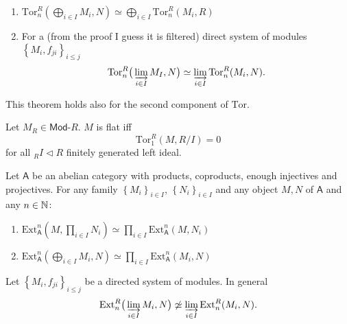 \begin{prop}\leavevmode\vspace{-.2\baselineskip}
	\begin{enumerate}
		\item $\mathrm{Tor}^R_n \left( \bigoplus_{i \in I} M_i, N \right) \simeq
			\bigoplus_{i \in I} \mathrm{Tor}^R_n(M_i,R)$

		\item For a (from the proof I guess it is filtered)
			direct system of modules $\left\{ M_i, f_{ji} \right\}_{i \leq j}$
			\begin{equation}
				\mathrm{Tor}^R_n \big( \varinjlim_{i \in I} M_I, N \big) \simeq
				\varinjlim_{i \in I} \mathrm{Tor}^R_n(M_i, N)
			.\end{equation} 
	\end{enumerate}
	This theorem holds also for the second component of $\mathrm{Tor}$.
\end{prop}

\begin{lem}
	Let $M_R \in \mathsf{Mod}\text{-}R$.
	$M$ is flat iff 
	\begin{equation}
		\mathrm{Tor}^R_1 (M, R/I) = 0
	\end{equation} 
	for all ${}_RI \triangleleft R$ finitely generated left ideal.
\end{lem} 

\begin{prop}
	Let $\mathsf{A}$ be an abelian category with products, coproducts,
	enough injectives and projectives.
	For any family $\left\{ M_i \right\}_{i \in I}$, $\left\{ N_i \right\}_{i \in I}$ and
	any object $M,N$ of $\mathsf{A}$ and any $n \in \mathbb{N}$:
	\begin{enumerate}
		\item $\mathrm{Ext}^n_{\mathsf{A}} \left( M, \prod_{i \in I} N_i\right) \simeq
			\prod_{i \in I} \mathrm{Ext}^n_{\mathsf{A}}(M,N_i)$
		\item $\mathrm{Ext}^n_{\mathsf{A}} \left( \bigoplus_{i \in I}M_i, N \right) \simeq
			\prod_{i \in I} \mathrm{Ext}^n_{\mathsf{A}}(M_i,N)$
	\end{enumerate}
\end{prop}

\begin{rem}[]
	Let $\left\{ M_i, f_{ji} \right\}_{i \leq j}$ be a directed system of modules.
	In general
	\begin{equation}
		\mathrm{Ext}^R_n \big( \varinjlim_{i \in I} M_i, N\big)
		\not\simeq \varinjlim_{i \in I} \mathrm{Ext}^R_n (M_i, N)
	.\end{equation} 
\end{rem}

